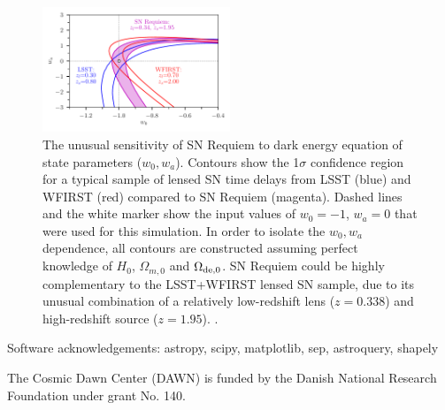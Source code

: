 \documentclass[twocolumn]{aastex63}
\begin{document}
\begin{figure}
    \centering
    \includegraphics[width=0.5\textwidth]{Paper/Figures/snrequiem_w0wa_compared_to_lsst_wfirst.pdf}
    \caption{The unusual sensitivity of SN Requiem to dark energy equation of state parameters ($w_0, w_a$). Contours show the 1$\sigma$ confidence region for a typical sample of lensed SN time delays from LSST (blue) and WFIRST (red) compared to SN Requiem (magenta). Dashed lines and the white marker show the input values of $w_0=-1$, $w_a=0$ that were used for this simulation. In order to isolate the $w_0, w_a$ dependence, all contours are constructed assuming perfect knowledge of $H_0$, $\Omega_{m,0}$ and $\Omega_{\rm de,0}$.  SN Requiem could be highly complementary to the LSST+WFIRST lensed SN sample, due to its unusual combination of a relatively low-redshift lens ($z=0.338$) and high-redshift source ($z=1.95$). . }
    \label{fig:my_label}
\end{figure}


\acknowledgments
Software acknowledgements: astropy, scipy, matplotlib, sep, astroquery, shapely

The Cosmic Dawn Center (DAWN) is funded by the Danish National Research Foundation under grant No. 140. 


\pagebreak






\pagebreak

\appendix
\end{document}
